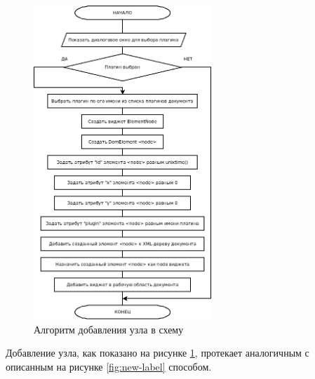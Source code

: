 \begin{figure}[H]
  \centering
  \includegraphics[width=0.6\textwidth]{diagrams/block-schemes/add-node.png}
  \caption{Алгоритм добавления узла в схему}
  \label{fig:new-node}
\end{figure}

Добавление узла, как показано на рисунке \ref{fig:new-node}, протекает аналогичным с описанным на рисунке \ref{fig:new-label} способом.

